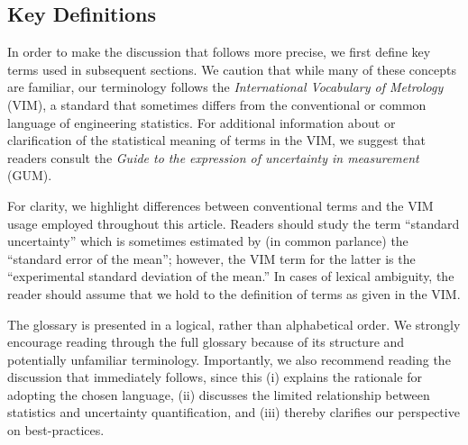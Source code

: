 \subsection{Key Definitions}

In order to make the discussion that follows more precise, we first define key terms used in subsequent sections.
We caution that while many of these concepts are familiar, our terminology follows the {\it International Vocabulary of Metrology} (VIM)\citep{JCGM:VIM2012}, a standard that sometimes differs from the conventional or common language of engineering statistics.   For additional information about or clarification of the statistical meaning of terms in the VIM, we suggest that readers consult the {\it Guide to the expression of uncertainty in measurement} (GUM)\citep{JCGM:GUM2008}.

For clarity, we highlight differences between conventional terms and the VIM usage employed throughout this article.
Readers should study the term ``standard uncertainty'' which is sometimes estimated by (in common parlance) the ``standard error of the mean''; however, the VIM term for the latter is the ``experimental standard deviation of the mean.''
In cases of lexical ambiguity, the reader should assume that we hold to the definition of terms as given in the VIM.

The glossary is presented in a logical, rather than alphabetical order.  We strongly encourage reading through the full glossary because of its structure and potentially unfamiliar terminology.  Importantly, we also recommend reading the discussion that immediately follows, since this (i) explains the rationale for adopting the chosen language, (ii)  discusses the limited relationship between statistics and uncertainty quantification, and (iii) thereby clarifies our perspective on best-practices. 


